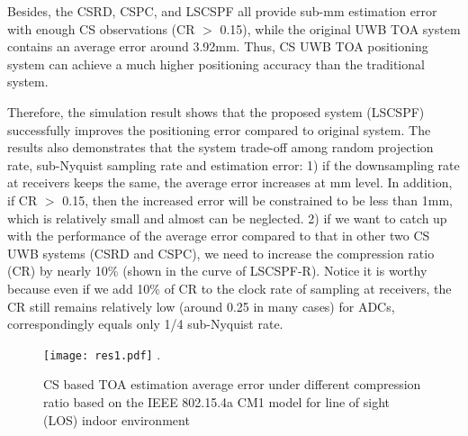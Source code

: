 Besides, the CSRD, CSPC, and LSCSPF all provide sub-mm estimation error with enough CS observations (CR $>$ 0.15), while the original UWB TOA system contains an average error around 3.92mm. Thus, CS UWB TOA positioning system can achieve a much higher positioning accuracy than the traditional system. 

Therefore, the simulation result shows that the proposed system (LSCSPF) successfully improves the positioning error compared to original system. The results also demonstrates that the system trade-off among random projection rate, sub-Nyquist sampling rate and estimation error: 1) if the downsampling rate at receivers keeps the same, the average error increases at mm level. In addition, if CR $>$ 0.15, then the increased error will be constrained to be less than 1mm, which is relatively small and almost can be neglected. 2) if we want to catch up with the performance of the average error compared to that in other two CS UWB systems (CSRD and CSPC), we need to increase the compression ratio (CR) by nearly 10\% (shown in the curve of LSCSPF-R). Notice it is worthy because even if we add 10\% of CR to the clock rate of sampling at receivers, the CR still remains relatively low (around 0.25 in many cases) for ADCs, correspondingly equals only 1/4 sub-Nyquist rate.     

\begin{figure}[!t]
\centering
\texttt{[image: res1.pdf]}
\DeclareGraphicsExtensions.
\caption{CS based TOA estimation average error under different compression ratio based on the IEEE 802.15.4a CM1 model for line of sight (LOS) indoor environment}
\label{res1}
\end{figure}
